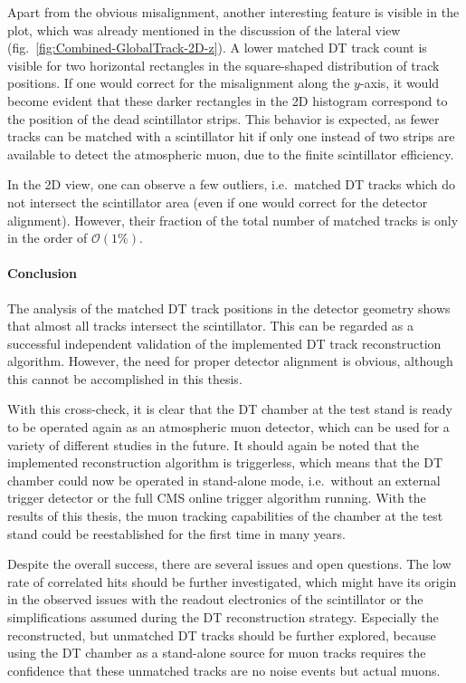 \par Apart from the obvious misalignment, another interesting feature is visible in the plot, which was already mentioned in the discussion of the lateral view (fig.\ \ref{fig:Combined-GlobalTrack-2D-z}). A lower matched \ac{DT} track count is visible for two horizontal rectangles in the square-shaped distribution of track positions. If one would correct for the misalignment along the $y$-axis, it would become evident that these darker rectangles in the 2D histogram correspond to the position of the dead scintillator strips. This behavior is expected, as fewer tracks can be matched with a scintillator hit if only one instead of two strips are available to detect the atmospheric muon, due to the finite scintillator efficiency.
\par In the 2D view, one can observe a few outliers, i.e.\ matched \ac{DT} tracks which do not intersect the scintillator area (even if one would correct for the detector alignment). However, their fraction of the total number of matched tracks is only in the order of $\mathcal{O}(1\%)$.

\paragraph{Conclusion}
The analysis of the matched \ac{DT} track positions in the detector geometry shows that almost all tracks intersect the scintillator. This can be regarded as a successful independent validation of the implemented \ac{DT} track reconstruction algorithm. However, the need for proper detector alignment is obvious, although this cannot be accomplished in this thesis.
\par With this cross-check, it is clear that the \ac{DT} chamber at the test stand is ready to be operated again as an atmospheric muon detector, which can be used for a variety of different studies in the future. It should again be noted that the implemented reconstruction algorithm is triggerless, which means that the \ac{DT} chamber could now be operated in stand-alone mode, i.e.\ without an external trigger detector or the full \ac{CMS} online trigger algorithm running. With the results of this thesis, the muon tracking capabilities of the chamber at the test stand could be reestablished for the first time in many years.
\par Despite the overall success, there are several issues and open questions. The low rate of correlated hits should be further investigated, which might have its origin in the observed issues with the readout electronics of the scintillator or the simplifications assumed during the \ac{DT} reconstruction strategy. Especially the reconstructed, but unmatched \ac{DT} tracks should be further explored, because using the \ac{DT} chamber as a stand-alone source for muon tracks requires the confidence that these unmatched tracks are no noise events but actual muons.

